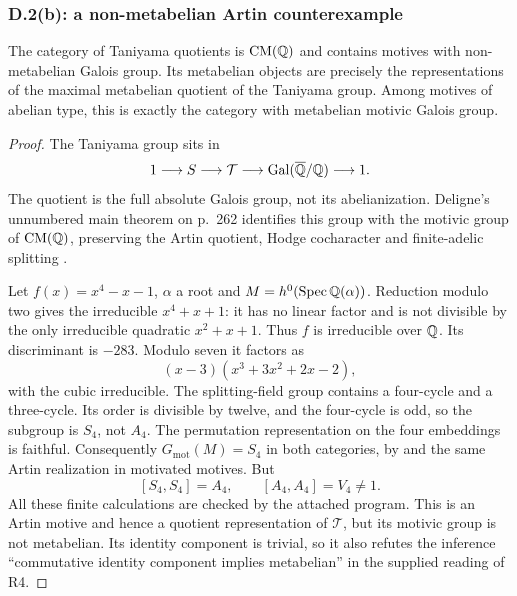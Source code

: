 \subsubsection{D.2(b): a non-metabelian Artin counterexample}

\begin{proposition}
\label{prop:d-metabelian-false}
The category of Taniyama quotients is $\operatorname{CM}(\mathbb Q)$ and contains
motives with non-metabelian Galois group.  Its metabelian objects
are precisely the representations of the maximal metabelian quotient
of the Taniyama group.  Among motives of abelian type, this is
exactly the category with metabelian motivic Galois group.
\end{proposition}

\begin{proof}
The Taniyama group sits in
\begin{equation}
 1\longrightarrow S\longrightarrow\mathcal T
 \longrightarrow\operatorname{Gal}(\overline{\mathbb Q}/\mathbb Q)\longrightarrow1.
 \label{eq:d-taniyama}
\end{equation}
The quotient is the full absolute Galois group, not its abelianization.
Deligne's unnumbered main theorem on p.~262 identifies this group with
the motivic group of $\operatorname{CM}(\mathbb Q)$, preserving the Artin quotient, Hodge
cocharacter and finite-adelic splitting
\citep[pp.~261--264, main theorem and Lemmas 1--2]{c_delignetaniyama1982}.

Let $f(x)=x^4-x-1$, $\alpha$ a root and
$M=h^0(\operatorname{Spec}\mathbb Q(\alpha))$.  Reduction modulo two gives the irreducible
$x^4+x+1$: it has no linear factor and is not divisible by the only
irreducible quadratic $x^2+x+1$.  Thus $f$ is irreducible over $\mathbb Q$.
Its discriminant is $-283$.  Modulo seven it factors as
\[
 (x-3)(x^3+3x^2+2x-2),
\]
with the cubic irreducible.  The splitting-field group contains a
four-cycle and a three-cycle.  Its order is divisible by twelve,
and the four-cycle is odd, so the subgroup is $S_4$, not $A_4$.
The permutation representation on the four embeddings is faithful.
Consequently $G_{\mathrm{mot}}(M)=S_4$ in both categories, by
\citet[Proposition 8.17]{c_delignehodge1982} and the same Artin
realization in motivated motives.  But
\[
 [S_4,S_4]=A_4,\qquad[A_4,A_4]=V_4\ne1.
\]
All these finite calculations are checked by the attached program.
This is an Artin motive and hence a quotient representation of
$\mathcal T$, but its motivic group is not metabelian.  Its identity
component is trivial, so it also refutes the inference ``commutative
identity component implies metabelian'' in the supplied reading of R4.


\end{proof}

